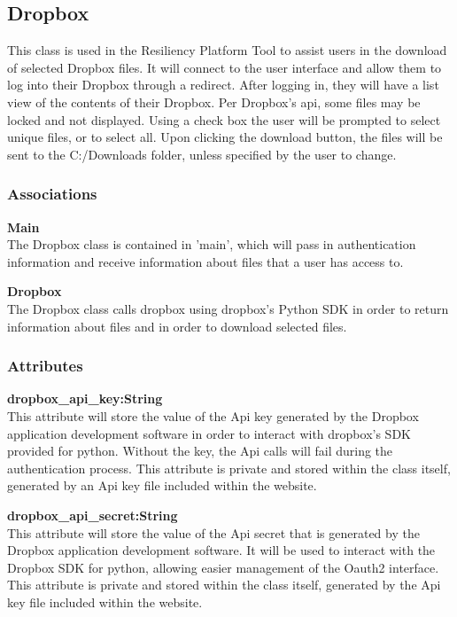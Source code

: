 \subsection{Dropbox}
This class is used in the Resiliency Platform Tool to assist users in the download of selected Dropbox files.
It will connect to the user interface and allow them to log into their Dropbox through a redirect. After logging
in, they will have a list view of the contents of their Dropbox. Per Dropbox's api, some files may be locked and 
not displayed. Using a check box the user will be prompted to select unique files, or to select all. Upon clicking 
the download button, the files will be sent to the C:/Downloads folder, unless specified by the user to change.

\subsubsection{Associations}
\textbf{Main} \\
The Dropbox class is contained in 'main', which will pass in authentication information and receive information about files 
that a user has access to.

\textbf{Dropbox} \\
The Dropbox class calls dropbox using dropbox's Python SDK in order to return information about files and in order
to download selected files.

\subsubsection{Attributes}
\textbf{dropbox\_api\_key:String} \\
    This attribute will store the value of the Api key generated by the Dropbox application development software 
    in order to interact with dropbox's SDK provided for python. Without the key, the Api calls will fail during 
    the authentication process. This attribute is private and stored within the class itself, generated by an Api
    key file included within the website.

\textbf{dropbox\_api\_secret:String} \\
    This attribute will store the value of the Api secret that is generated by the Dropbox application development
    software. It will be used to interact with the Dropbox SDK for python, allowing easier management of the Oauth2
    interface. This attribute is private and stored within the class itself, generated by the Api key file included 
    within the website.

